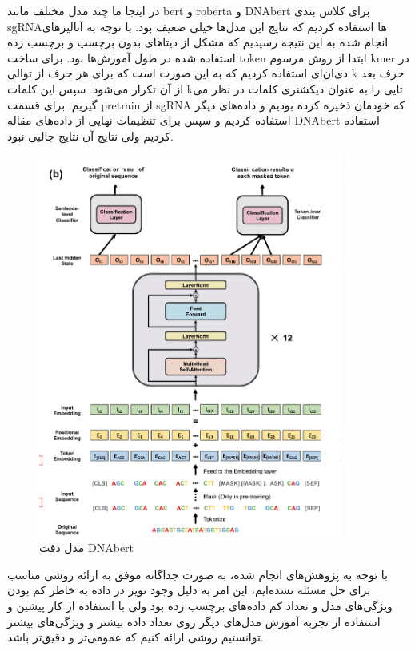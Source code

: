 \documentclass[12pt,a4paper,BCOR=.7cm,headsepline,bibliography=totoc]{report}
\begin{document}
در اینجا ما چند مدل مختلف مانند bert و roberta و DNAbert \cite{DNABERT} برای کلاس بندی sgRNAها استفاده کردیم که نتایج این مدل‌ها خیلی ضعیف بود. با توجه به آنالیزهای انجام شده به این نتیجه رسیدیم که مشکل از دیتاهای بدون برچسپ و برچسب زده استفاده شده در طول آموزش‌ها بود. برای ساخت token ابتدا از روش مرسوم kmer در دی‌ان‌ای استفاده کردیم که به این صورت است که برای هر حرف از توالی k حرف بعد از آن تکرار می‌شود. سپس این کلمات kتایی را به عنوان دیکشنری کلمات در نظر می گیریم. برای قسمت pretrain از sgRNA که خودمان ذخیره کرده بودیم و داده‌های دیگر استفاده کردیم و سپس برای تنظیمات نهایی از داده‌های مقاله DNAbert استفاده کردیم ولی نتایج آن نتایج جالبی نبود.
\begin{figure}
\centering
\includegraphics[width=10cm, ]{pictures/dnabert.jpg}
\caption{
مدل دقت DNAbert \cite{DNABERT}
}\label{wrap-fig:4}
\end{figure}



با توجه به پژوهش‌های انجام شده، به صورت جداگانه موفق به ارائه روشی مناسب برای حل مسئله نشده‌ایم، این امر به دلیل وجود نویز در داده به خاطر کم بودن ویژگی‌های مدل و تعداد کم داده‌های برچسب زده بود ولی با استفاده از کار پیشین و استفاده از تجربه آموزش مدل‌های دیگر روی تعداد داده بیشتر و ویژگی‌های بیشتر توانستیم روشی ارائه کنیم که عمومی‌تر و دقیق‌تر باشد.
\end{document}
